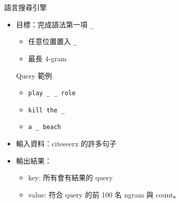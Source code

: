 \documentclass[12pt,c]{beamer}
\begin{document}
\begin{frame}{語言搜尋引擎}
  \begin{itemize}
  \item 目標：完成語法第一項 \lstinline/_/
    \begin{itemize}
    \item 任意位置置入 \lstinline/_/
    \item 最長 4-gram
    \end{itemize}
    \begin{block}{Query 範例}
      \begin{itemize}
      \item \lstinline/play _ _ role/
      \item \lstinline/kill the _/
      \item \lstinline/a _ beach/
      \end{itemize}
    \end{block}
  \item 輸入資料：citeseerx 的許多句子
  \item 輸出結果：
    \begin{itemize}
    \item key: 所有會有結果的 query
    \item value: 符合 query 的前 100 名 ngram 與 count。
    \end{itemize}
  \end{itemize}

\end{frame}
\end{document}
